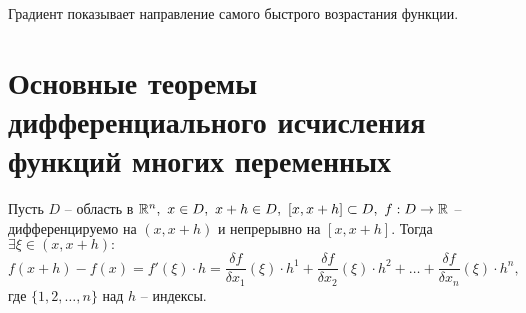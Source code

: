 \begin{note}
    Градиент показывает направление самого быстрого возрастания функции.
\end{note}

\newpage

\section{Основные теоремы дифференциального исчисления функций многих переменных}

\begin{theorem}[О среднем]
    Пусть $ D $ -- область в $ \R^n, \ x \in D, \ x + h \in D, \ [x, x+h]\subset D, \ f: D \rightarrow\R $ -- дифференцируемо на $ (x,x+h) $ и непрерывно на $ [x,x+h] $. Тогда $ \exists \xi \in (x,x+h): $
    \[
        f(x+h)-f(x) = f'(\xi)\cdot h = \frac{\delta f}{\delta x_1}(\xi)\cdot h^1 + \frac{\delta f}{\delta x_2}(\xi)\cdot h^2 + \ldots + \frac{\delta f}{\delta x_n}(\xi)\cdot h^n,
    \] где $ \{1,2,\ldots,n\} $ над $ h $ -- индексы.
\end{theorem}

